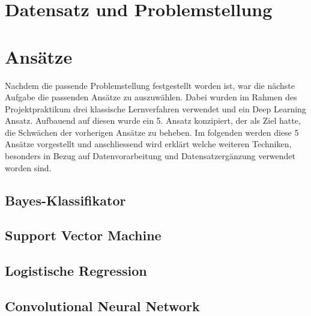 \documentclass[researchlab,palatino]{AIGpaper}
\begin{document}
\section{Datensatz und Problemstellung}
\label{Datensatz}


\section{Ansätze}
\label{Ansätze}
Nachdem die passende Problemstellung festgestellt worden ist, war die nächste Aufgabe die passenden Ansätze zu auszuwählen. Dabei wurden im Rahmen des Projektpraktikum drei klassische Lernverfahren verwendet und ein Deep Learning Ansatz. Aufbauend auf diesen wurde ein 5. Ansatz konzipiert, der als Ziel hatte, die Schwächen der vorherigen Ansätze zu beheben. Im folgenden werden diese 5 Ansätze vorgestellt und anschliessend wird erklärt welche weiteren Techniken, besonders in Bezug auf Datenvorarbeitung und Datensatzergänzung verwendet worden sind.

\subsection{Bayes-Klassifikator}
\label{sec:Bayes-Klassifikator}


\subsection{Support Vector Machine}
\label{SVM}


\subsection{Logistische Regression}
\label{Logistische Regression}


\subsection{Convolutional Neural Network}
\label{CNN}

\end{document}
